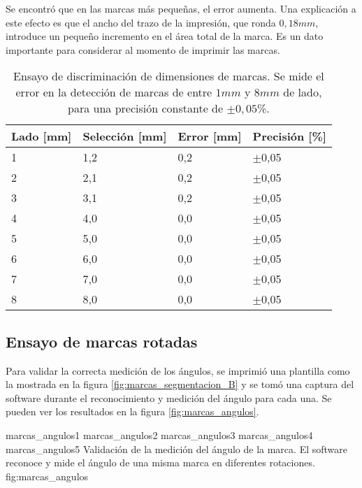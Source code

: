 Se encontró que en las marcas más pequeñas, el error aumenta. Una explicación a este efecto es que el ancho del trazo de la impresión, que ronda $0,18 mm$, introduce un pequeño incremento en el área total de la marca. Es un dato importante para considerar al momento de imprimir las marcas.

      \begin{table}[!ht]
         \centering
         \caption[Ensayos de discriminación de dimensiones de marcas.]{Ensayo de discriminación de dimensiones de marcas. Se mide el error en la detección de marcas de entre $1 mm$ y $8 mm$ de lado, para una precisión constante de $\pm0,05$\%.}
         \begin{tabular}[!ht]{m{1.6cm}m{1.6cm}m{1.6cm}m{1.6cm}}
            \toprule
            \textbf{Lado [mm]} & \textbf{Selección [mm]} & \textbf{Error [mm]}& \textbf{Precisión [\%]}\\
            \midrule
            {1}& {1,2}& {0,2}& {$\pm$0,05}\\
            {2}& {2,1}& {0,2}& {$\pm$0,05}\\
            {3}& {3,1}& {0,2}& {$\pm$0,05}\\
            {4}& {4,0}& {0,0}& {$\pm$0,05}\\
            {5}& {5,0}& {0,0}& {$\pm$0,05}\\
            {6}& {6,0}& {0,0}& {$\pm$0,05}\\
            {7}& {7,0}& {0,0}& {$\pm$0,05}\\
            {8}& {8,0}& {0,0}& {$\pm$0,05}\\
            \bottomrule
         \end{tabular}
         \label{tbl:marcas_dimensiones}
      \end{table}

\subsection{Ensayo de marcas rotadas}

Para validar la correcta medición de los ángulos, se imprimió una plantilla como la mostrada en la figura \ref{fig:marcas_segmentacion_B} y se tomó una captura del software durante el reconocimiento y medición del ángulo para cada una. Se pueden ver los resultados en la figura \ref{fig:marcas_angulos}.

\subfigthreetwo
   {marcas_angulos1}
   {marcas_angulos2}
   {marcas_angulos3}
   {marcas_angulos4}
   {marcas_angulos5}
   {Validación de la medición del ángulo de la marca. El software reconoce y mide el ángulo de una misma marca en diferentes rotaciones.}
   {fig:marcas_angulos}

